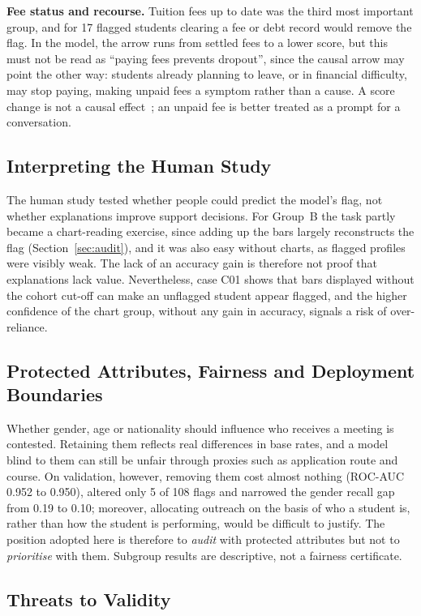 \textbf{Fee status and recourse.} Tuition fees up to date was the third most important group, and
for 17 flagged students clearing a fee or debt record would remove the flag. In the model, the arrow
runs from settled fees to a lower score, but this must not be read as ``paying fees prevents
dropout'', since the causal arrow may point the other way: students
already planning to leave, or in financial difficulty, may stop paying, making unpaid fees a symptom
rather than a cause. A score change is not a causal effect~\citep{karimi2021recourse};
an unpaid fee is better treated as a prompt for a conversation.

\subsection{Interpreting the Human Study}

The human study tested whether people could predict the model's flag, not whether explanations
improve support decisions. For Group~B the task partly became a chart-reading exercise, since adding
up the bars largely reconstructs the flag (Section~\ref{sec:audit}), and it was also easy without
charts, as flagged profiles were visibly weak. The lack of an accuracy gain is therefore not proof that
explanations lack value. Nevertheless, case C01 shows that bars displayed without the cohort cut-off can make an
unflagged student appear flagged, and the higher confidence of the chart group, without any gain in
accuracy, signals a risk of over-reliance.
\subsection{Protected Attributes, Fairness and Deployment Boundaries}

Whether gender, age or nationality should influence who receives a meeting is contested. Retaining
them reflects real differences in base rates, and a model blind to them can still be unfair through
proxies such as application route and course. On validation, however, removing them cost almost
nothing (ROC-AUC 0.952 to 0.950), altered only 5 of 108 flags and narrowed the gender recall gap
from 0.19 to 0.10; moreover, allocating
outreach on the basis of who a student is, rather than how the student is performing, would be
difficult to justify. The position adopted here is therefore to \emph{audit} with protected
attributes but not to \emph{prioritise} with them. Subgroup results are descriptive, not a fairness
certificate.

\subsection{Threats to Validity}

